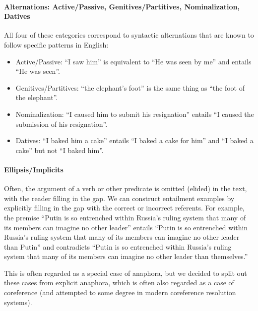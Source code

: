 \documentclass{article} \usepackage{iclr2019_conference,times}
\begin{document}
\paragraph{Alternations: Active/Passive, Genitives/Partitives, Nominalization, Datives} All four of these categories correspond to syntactic alternations that are known to follow specific patterns in English:
\begin{itemize}
    \item Active/Passive: ``I saw him'' is equivalent to ``He was seen by me'' and entails ``He was seen''.
    \item Genitives/Partitives: ``the elephant's foot'' is the same thing as ``the foot of the elephant''.
    \item Nominalization: ``I caused him to submit his resignation'' entails ``I caused the submission of his resignation''.
    \item Datives: ``I baked him a cake'' entails ``I baked a cake for him'' and ``I baked a cake'' but not ``I baked him''.
\end{itemize}

\paragraph{Ellipsis/Implicits} Often, the argument of a verb or other predicate is omitted (elided) in the text, with the reader filling in the gap. We can construct entailment examples by explicitly filling in the gap with the correct or incorrect referents. For example, the premise ``Putin is so entrenched within Russia’s ruling system that many of its members can imagine no other leader'' entails ``Putin is so entrenched within Russia’s ruling system that many of its members can imagine no other leader than Putin'' and contradicts ``Putin is so entrenched within Russia’s ruling system that many of its members can imagine no other leader than themselves.''

This is often regarded as a special case of anaphora, but we decided to split out these cases from explicit anaphora, which is often also regarded as a case of coreference (and attempted to some degree in modern coreference resolution systems).
\end{document}
